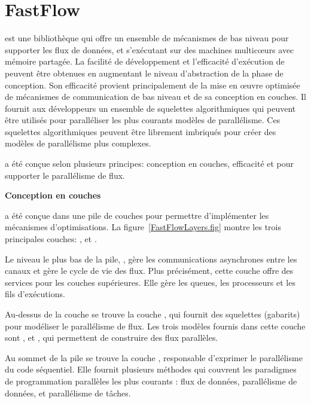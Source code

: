 \section{FastFlow}

 est une biblioth\`eque  qui offre un ensemble de m\'ecanismes de bas niveau pour supporter les flux de donn\'ees, et s'ex\'ecutant sur des machines multicœurs avec m\'emoire partag\'ee. La facilit\'e de d\'eveloppement et l'efficacit\'e d'ex\'ecution de  peuvent \^etre obtenues en augmentant le niveau d'abstraction de la phase de conception. Son efficacit\'e provient principalement de la mise en œuvre optimis\'ee de m\'ecanismes de communication de bas niveau et de sa conception en couches. Il fournit aux d\'eveloppeurs un ensemble de squelettes algorithmiques qui peuvent \^etre utilis\'es pour parall\'eliser les plus courants mod\`eles de parall\'elisme. Ces squelettes algorithmiques peuvent \^etre librement imbriqu\'es pour cr\'eer des mod\`eles de parall\'elisme plus complexes.

 a \'et\'e conçue selon plusieurs principes: conception en couches, efficacit\'e et pour supporter le parall\'elisme de flux.

\textbf{Conception en couches}

 a \'et\'e conçue dans une pile de couches pour permettre d'impl\'ementer les m\'ecanismes d'optimisations. La figure~\ref{FastFlowLayers.fig} montre les trois principales couches: ,  et . 

Le niveau le plus bas de la pile, , g\`ere les communications asynchrones entre les canaux et g\`ere le cycle de vie des flux. Plus pr\'ecis\'ement, cette couche offre des services pour les couches sup\'erieures. Elle g\`ere les queues, les processeurs et les fils d'ex\'ecutions.

Au-dessus de la couche  se trouve la couche , qui fournit des squelettes (gabarits) pour mod\'eliser le parall\'elisme de flux. Les trois mod\`eles fournis dans cette couche sont ,  et , qui permettent de construire des flux parall\`eles. 

Au sommet de la pile se trouve la couche , responsable d'exprimer le parall\'elisme du code s\'equentiel. Elle fournit plusieurs m\'ethodes qui couvrent les paradigmes de programmation parall\`eles les plus courants : flux de donn\'ees, parall\'elisme de donn\'ees, et  parall\'elisme de t\^aches. 

